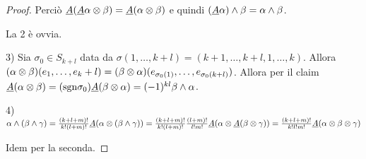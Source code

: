 \begin{proof}
	Perciò $\antisimm(\antisimm\alpha\otimes \beta) = \antisimm(\alpha\otimes\beta)$ e quindi $(\antisimm\alpha)\wedge\beta = \alpha\wedge\beta$.
	
	La 2 è ovvia.
	
	3) 
	Sia $\sigma_0\in S_{k+l}$ data da $\sigma(1,\ldots,k+l) = (k+1,\ldots,k+l,1,\ldots,k)$. Allora $(\alpha\otimes \beta)(\seqb{e}{k+l}{,}) = (\beta\otimes \alpha)(e_{\sigma_0(1)},\ldots,e_{\sigma_0(k+l)})$.
	Allora per il claim $\antisimm(\alpha\otimes\beta) = (\sgn\sigma_0) \antisimm(\beta\otimes\alpha)=(-1)^{kl} \beta \wedge \alpha$.

	4)
	$\alpha\wedge(\beta\wedge\gamma) = \frac{(k+l+m)!}{k!(l+m)!}\antisimm(\alpha\otimes(\beta\wedge\gamma)) = \frac{(k+l+m)!}{k!(l+m)!} \frac{(l+m)!}{l!m!} \antisimm(\alpha\otimes\antisimm(\beta\otimes\gamma))= \frac{(k+l+m)!}{k!l!m!}\antisimm(\alpha\otimes\beta\otimes\gamma)$
	
	Idem per la seconda.

\end{proof}

















































